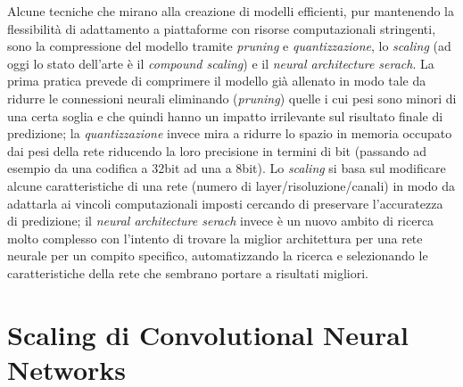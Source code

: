 Alcune tecniche che mirano alla creazione di modelli efficienti, pur mantenendo la flessibilità di adattamento a piattaforme con risorse computazionali stringenti, sono la compressione del modello tramite \textit{pruning} e \textit{quantizzazione}, lo \textit{scaling} (ad oggi lo stato dell'arte è il \textit{compound scaling}) e il \textit{neural architecture serach}. La prima pratica prevede di comprimere il modello già allenato in modo tale da ridurre le connessioni neurali eliminando (\textit{pruning}) quelle i cui pesi sono minori di una certa soglia e che quindi hanno un impatto irrilevante sul risultato finale di predizione; la \textit{quantizzazione} invece mira a ridurre lo spazio in memoria occupato dai pesi della rete riducendo la loro precisione in termini di bit (passando ad esempio da una codifica a 32bit ad una a 8bit). Lo \textit{scaling} si basa sul modificare alcune caratteristiche di una rete (numero di layer/risoluzione/canali) in modo da adattarla ai vincoli computazionali imposti cercando di preservare l'accuratezza di predizione; il \textit{neural architecture serach} invece è un nuovo ambito di ricerca molto complesso con l'intento di trovare la miglior architettura per una rete neurale per un compito specifico, automatizzando la ricerca e selezionando le caratteristiche della rete che sembrano portare a risultati migliori. 


\newpage
\section{Scaling di Convolutional Neural Networks}


